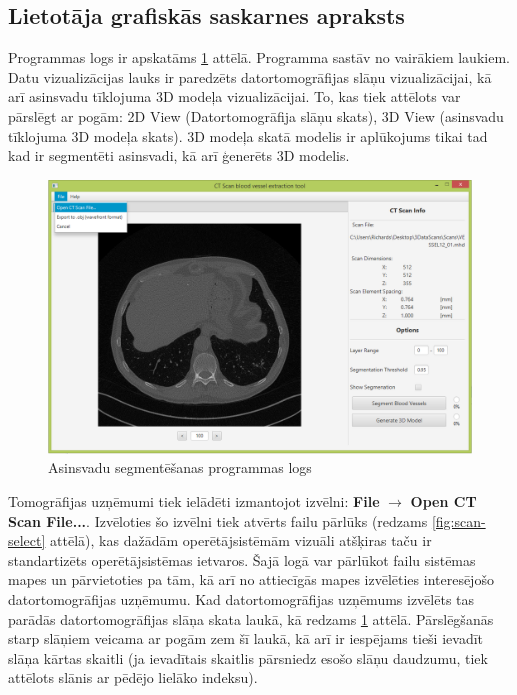 \subsection{Lietotāja grafiskās saskarnes apraksts}
Programmas logs ir apskatāms \ref{fig:vessel-extractor} attēlā. Programma sastāv no vairākiem laukiem.  Datu vizualizācijas lauks ir paredzēts datortomogrāfijas slāņu vizualizācijai, kā arī asinsvadu tīklojuma 3D modeļa vizualizācijai. To, kas tiek attēlots var pārslēgt ar pogām: 2D View (Datortomogrāfija slāņu skats), 3D View (asinsvadu tīklojuma 3D modeļa skats). 3D modeļa skatā modelis ir aplūkojums tikai tad kad ir segmentēti asinsvadi, kā arī ģenerēts 3D modelis.
\begin{figure}[h]
\begin{center}
\includegraphics[scale=0.45]{img/vessel-extractor.png}
\caption{Asinsvadu segmentēšanas programmas logs}
\label{fig:vessel-extractor}
\end{center}
\end{figure}

Tomogrāfijas uzņēmumi tiek ielādēti izmantojot izvēlni: \textbf{File} $\rightarrow{}$  \textbf{Open CT Scan File...}. Izvēloties šo izvēlni tiek atvērts failu pārlūks (redzams \ref{fig:scan-select} attēlā), kas dažādām operētājsistēmām vizuāli atšķiras taču ir standartizēts operētājsistēmas ietvaros. Šajā logā var pārlūkot failu sistēmas mapes un pārvietoties pa tām, kā arī no attiecīgās mapes izvēlēties interesējošo datortomogrāfijas uzņēmumu. Kad datortomogrāfijas uzņēmums izvēlēts tas parādās datortomogrāfijas slāņa skata laukā, kā redzams \ref{fig:vessel-extractor} attēlā. Pārslēgšanās starp slāņiem veicama ar pogām zem šī laukā, kā arī ir iespējams tieši ievadīt slāņa kārtas skaitli (ja ievadītais skaitlis pārsniedz esošo slāņu daudzumu, tiek attēlots slānis ar pēdējo lielāko indeksu).

